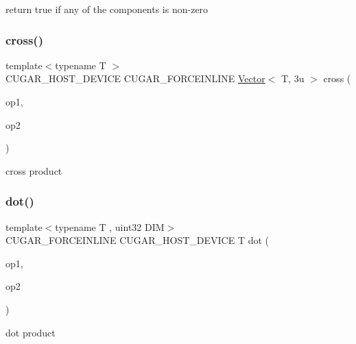 return true if any of the components is non-\/zero \mbox{\label{group___vectors_module_ga2a5c1ab56c232bc5ab7c39a2837d0ca5}} 
\subsubsection{\texorpdfstring{cross()}{cross()}}
{\footnotesize\ttfamily template$<$typename T $>$ \\
C\+U\+G\+A\+R\+\_\+\+H\+O\+S\+T\+\_\+\+D\+E\+V\+I\+CE C\+U\+G\+A\+R\+\_\+\+F\+O\+R\+C\+E\+I\+N\+L\+I\+NE \hyperlink{structcugar_1_1_vector}{Vector}$<$ T, 3u $>$ cross (\begin{DoxyParamCaption}\item[{const \hyperlink{structcugar_1_1_vector}{Vector}$<$ T, 3u $>$ \&}]{op1,  }\item[{const \hyperlink{structcugar_1_1_vector}{Vector}$<$ T, 3u $>$ \&}]{op2 }\end{DoxyParamCaption})\hspace{0.3cm}{\ttfamily [related]}}

cross product \mbox{\label{group___vectors_module_gab7854923b97b44405c7335f0df540fd3}} 
\subsubsection{\texorpdfstring{dot()}{dot()}}
{\footnotesize\ttfamily template$<$typename T , uint32 D\+IM$>$ \\
C\+U\+G\+A\+R\+\_\+\+F\+O\+R\+C\+E\+I\+N\+L\+I\+NE C\+U\+G\+A\+R\+\_\+\+H\+O\+S\+T\+\_\+\+D\+E\+V\+I\+CE T dot (\begin{DoxyParamCaption}\item[{const \hyperlink{structcugar_1_1_vector}{Vector}$<$ T, D\+IM $>$ \&}]{op1,  }\item[{const \hyperlink{structcugar_1_1_vector}{Vector}$<$ T, D\+IM $>$ \&}]{op2 }\end{DoxyParamCaption})\hspace{0.3cm}{\ttfamily [related]}}

dot product \mbox{\label{group___vectors_module_ga62cacaa60db461c2298a9a51ab9128bc}} 
